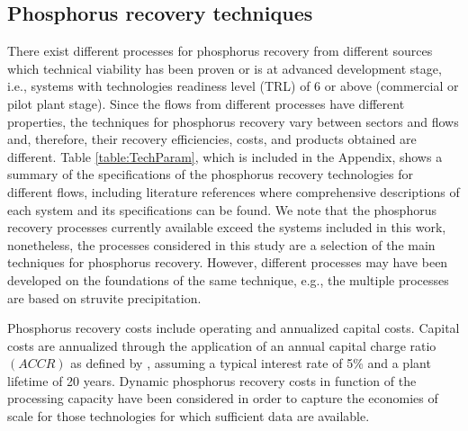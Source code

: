 \documentclass[authoryear]{elsarticle}
\begin{document}
\subsection{Phosphorus recovery techniques} \label{section:PRecoveryTechs}
There exist different processes for phosphorus recovery from different sources which technical viability has been proven or is at advanced development stage, i.e., systems with technologies readiness level (TRL) \citep{TRLDefinitions} of 6 or above (commercial or pilot plant stage). Since the flows from different processes have different properties, the techniques for phosphorus recovery vary between sectors and flows and, therefore, their recovery efficiencies, costs, and products obtained are different. Table \ref{table:TechParam}, which is included in the Appendix, shows a summary of the specifications of the phosphorus recovery technologies for different flows, including literature references where comprehensive descriptions of each system and its specifications can be found. We note that the phosphorus recovery processes currently available exceed the systems included in this work, nonetheless, the processes considered in this study are a selection of the main techniques for phosphorus recovery.
However, different processes may have been developed on the foundations of the same technique,
e.g., the multiple processes are based on struvite precipitation. 

Phosphorus recovery costs include operating and annualized capital costs. Capital costs are annualized through the application of an annual capital charge ratio $\left( ACCR\right)$ as defined by \citet{towler2013chemical}, assuming a typical interest rate of 5\% and a plant lifetime of 20 years. Dynamic phosphorus recovery costs in function of the processing capacity have been considered in order to capture the economies of scale for those technologies for which sufficient data are available.
\end{document}
